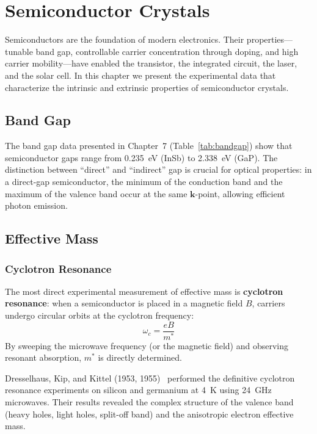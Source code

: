 \chapter{Semiconductor Crystals}

Semiconductors are the foundation of modern electronics. Their properties---tunable band gap, controllable carrier concentration through doping, and high carrier mobility---have enabled the transistor, the integrated circuit, the laser, and the solar cell. In this chapter we present the experimental data that characterize the intrinsic and extrinsic properties of semiconductor crystals.

\section{Band Gap}

The band gap data presented in Chapter~7 (Table~\ref{tab:bandgap}) show that semiconductor gaps range from \SI{0.235}{\electronvolt} (InSb) to \SI{2.338}{\electronvolt} (GaP). The distinction between ``direct'' and ``indirect'' gap is crucial for optical properties: in a direct-gap semiconductor, the minimum of the conduction band and the maximum of the valence band occur at the same $\mathbf{k}$-point, allowing efficient photon emission.

\section{Effective Mass}

\subsection{Cyclotron Resonance}

The most direct experimental measurement of effective mass is \textbf{cyclotron resonance}: when a semiconductor is placed in a magnetic field $B$, carriers undergo circular orbits at the cyclotron frequency:
\begin{equation}
  \omega_c = \frac{eB}{m^*}
\end{equation}
By sweeping the microwave frequency (or the magnetic field) and observing resonant absorption, $m^*$ is directly determined.

Dresselhaus, Kip, and Kittel (1953, 1955)~\cite{dresselhaus1955cyclotron} performed the definitive cyclotron resonance experiments on silicon and germanium at \SI{4}{\kelvin} using \SI{24}{\giga\hertz} microwaves. Their results revealed the complex structure of the valence band (heavy holes, light holes, split-off band) and the anisotropic electron effective mass.

